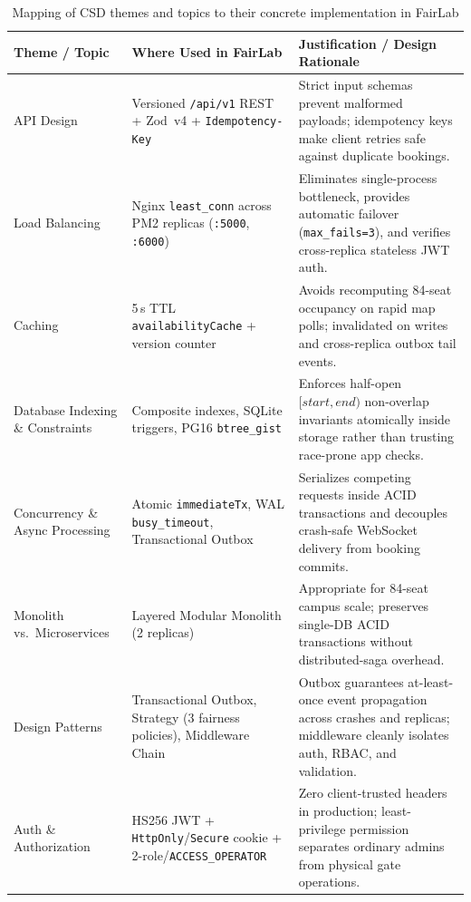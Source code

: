 \documentclass[manuscript,screen,review]{acmart}
\begin{document}
\begin{table}[t]
  \caption{Mapping of CSD themes and topics to their concrete implementation in FairLab}
  \label{tab:csd-themes}
  \footnotesize
  \setlength{\tabcolsep}{4.5pt}
  \renewcommand{\arraystretch}{1.18}
  \begin{tabularx}{\textwidth}{@{}p{}p{}X@{}}
    \toprule
    \textbf{Theme / Topic} & \textbf{Where Used in FairLab} & \textbf{Justification / Design Rationale} \\
    \midrule
    API Design & Versioned \texttt{/api/v1} REST + Zod~v4 + \texttt{Idempotency-Key} & Strict input schemas prevent malformed payloads; idempotency keys make client retries safe against duplicate bookings. \\
    Load Balancing & Nginx \texttt{least\_conn} across PM2 replicas (\texttt{:5000}, \texttt{:6000}) & Eliminates single-process bottleneck, provides automatic failover (\texttt{max\_fails=3}), and verifies cross-replica stateless JWT auth. \\
    Caching & 5\,s TTL \texttt{availabilityCache} + version counter & Avoids recomputing 84-seat occupancy on rapid map polls; invalidated on writes and cross-replica outbox tail events. \\
    Database Indexing \& Constraints & Composite indexes, SQLite triggers, PG16 \texttt{btree\_gist} & Enforces half-open $[start, end)$ non-overlap invariants atomically inside storage rather than trusting race-prone app checks. \\
    Concurrency \& Async Processing & Atomic \texttt{immediateTx}, WAL \texttt{busy\_timeout}, Transactional Outbox & Serializes competing requests inside ACID transactions and decouples crash-safe WebSocket delivery from booking commits. \\
    Monolith vs.\ Microservices & Layered Modular Monolith (2 replicas) & Appropriate for 84-seat campus scale; preserves single-DB ACID transactions without distributed-saga overhead. \\
    Design Patterns & Transactional Outbox, Strategy (3 fairness policies), Middleware Chain & Outbox guarantees at-least-once event propagation across crashes and replicas; middleware cleanly isolates auth, RBAC, and validation. \\
    Auth \& Authorization & HS256 JWT + \texttt{HttpOnly}/\texttt{Secure} cookie + 2-role/\texttt{ACCESS\_OPERATOR} & Zero client-trusted headers in production; least-privilege permission separates ordinary admins from physical gate operations. \\

\end{tabularx}
\end{table}
\end{document}
